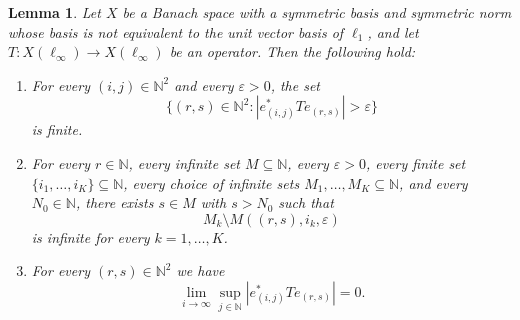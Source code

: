 \documentclass[11pt]{amsart}
\theoremstyle{plain}
\newtheorem{lemma}[theorem]{Lemma}
\theoremstyle{definition}
\numberwithin{equation}{section}
\newcommand{\N}{\mathbb{N}}
\begin{document}
\begin{lemma}\label{lmm: preliminary-l-infinity-iterated}
    Let $X$ be a Banach space with a symmetric basis and symmetric norm whose basis is not equivalent to the unit vector basis of $\ell_1$, and let $T\colon X(\ell_\infty)\to X(\ell_\infty)$ be an operator. Then the following hold:
    \begin{enumerate}[label = (\alph*), ref = (\alph*)]
        \item \label{it: l_infty-iterated-finitely-many-affect} For every $(i,j) \in \N^2$ and every $\varepsilon > 0$, the set
        \begin{equation*}
            \{(r,s) \in \N^2: |e^*_{(i,j)} T e_{(r,s)}| > \varepsilon\}
        \end{equation*}
        is finite.
        \item \label{it: l_infty-iterated-future-rows} For every $r \in \N$, every infinite set $M\subseteq\N$, every $\varepsilon > 0$, every finite set $\{i_1, \dots, i_K\}\subseteq\N$, every choice of infinite sets $M_1, \dots, M_K \subseteq \N$, and every $N_0\in\N$, there exists $s\in M$ with $s>N_0$ such that
        \begin{equation*}
            M_k \setminus M((r,s), i_k, \varepsilon)
        \end{equation*}
        is infinite for every $k = 1, \dots, K$.
        \item \label{it: l_infty-iterated-influence-future} For every $(r,s) \in \N^2$ we have
        \begin{equation*}
            \lim_{i \to \infty} \sup_{j \in \N} |e^*_{(i,j)} T e_{(r,s)}| = 0.
        \end{equation*}
    \end{enumerate}
\end{lemma}
\end{document}
